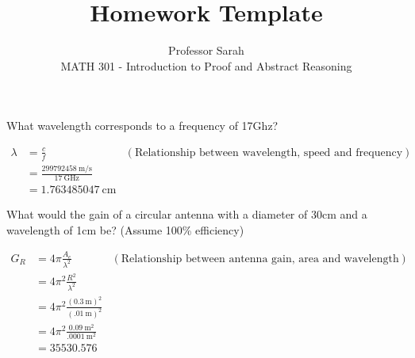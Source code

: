 \documentclass[12pt]{article}
\newenvironment{exercise}[2][Exercise]{\begin{trivlist}
    \item[\hskip \labelsep {\bfseries #1}\hskip \labelsep {\bfseries #2.}]}{\end{trivlist}}
\begin{document}
      
       
        
	\title{Homework Template}%
	\author{Professor Sarah\\ %
	MATH 301 - Introduction to Proof and Abstract Reasoning} %
	 
	 \maketitle
	  
      \begin{exercise}{1}
      What wavelength corresponds to a frequency of 17Ghz?
      
      \begin{align*}
      \lambda & = \frac{c}{f} & (\text{Relationship between wavelength, speed and frequency})\\
      & = \frac{\SI{299792458}{\meter\per\second}}{\SI{17}{\GHz}}\\
      & = \SI{1.763485047}{\cm}
      \end{align*}
      
      \end{exercise}
      
      \begin{exercise}{2}
      What would the gain of a circular antenna with a diameter of 30cm and a wavelength of 1cm be? (Assume 100\% efficiency)
      
      \begin{align*}
      G_{R} & = 4 \pi \frac{ A_{e} }{\lambda^{2}} & (\text{Relationship between antenna gain, area and wavelength})\\
      & = 4 \pi^{2} \frac{ R^{2}}{\lambda^{2}}\\
      & = 4 \pi^{2} \frac{ (\SI{0.3}{\meter})^{2}}{(\SI{.01}{\meter})^{2}}\\
      & = 4 \pi^{2} \frac{\SI{0.09}{\meter\squared}}{\SI{.0001}{\meter\squared}}\\
      & = \SI{35530.576}{}\\
      \end{align*}      
            
      \end{exercise}
      
\end{document}
